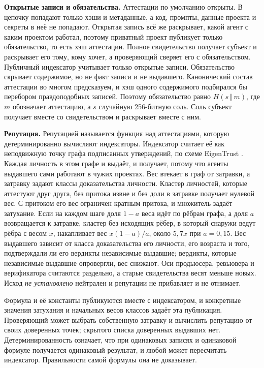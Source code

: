 \documentclass[10pt,a4paper]{article}
\newcommand{\cat}{\,\Vert\,}
\begin{document}
\textbf{Открытые записи и обязательства.}
Аттестации по умолчанию открыты.
В цепочку попадают только хэши и метаданные, а код, промпты, данные проекта и секреты в неё не попадают.
Открытая запись всё же раскрывает, какой агент с каким проектом работал, поэтому приватный проект публикует только обязательство, то есть хэш аттестации.
Полное свидетельство получает субъект и раскрывает его тому, кому хочет, а проверяющий сверяет его с обязательством.
Публичный индексатор учитывает только открытые записи.
Обязательство скрывает содержимое, но не факт записи и не выдавшего.
Канонический состав аттестации во многом предсказуем, и хэш одного содержимого подбирался бы перебором правдоподобных записей.
Поэтому обязательство равно $H(s\cat m)$, где $m$ обозначает аттестацию, а $s$ случайную 256-битную соль.
Соль субъект получает вместе со свидетельством и раскрывает вместе с ним.

\textbf{Репутация.}
Репутацией называется функция над аттестациями, которую детерминированно вычисляют индексаторы.
Индексатор считает её как неподвижную точку графа подписанных утверждений, по схеме EigenTrust \cite{eigentrust}.
Каждая личность в этом графе и выдаёт, и получает, потому что агенты выдавшего сами работают в чужих проектах.
Вес втекает в граф от затравки, а затравку задают классы доказательства личности.
Кластер личностей, которые аттестуют друг друга, без притока извне и без доли в затравке получает нулевой вес.
С притоком его вес ограничен кратным притока, и множитель задаёт затухание.
Если на каждом шаге доля $1-a$ веса идёт по рёбрам графа, а доля $a$ возвращается к затравке, кластер без исходящих рёбер, в который снаружи ведут рёбра с весом $x$, накапливает вес $x(1-a)/a$, около $5{,}7x$ при $a=0{,}15$.
Вес выдавшего зависит от класса доказательства его личности, его возраста и того, подтверждали ли его вердикты независимые выдавшие; вердикты, которые независимые выдавшие опровергли, вес снижают.
Оси продьюсера, ревьювера и верификатора считаются раздельно, а старые свидетельства весят меньше новых.
Исход \emph{не установлено} нейтрален и репутации не прибавляет и не отнимает.

Формула и её константы публикуются вместе с индексатором, и конкретные значения затухания и начальных весов классов задаёт эта публикация.
Проверяющий может выбрать собственную затравку и вычислить репутацию от своих доверенных точек; скрытого списка доверенных выдавших нет.
Детерминированность означает, что при одинаковых записях и одинаковой формуле получается одинаковый результат, и любой может пересчитать индексатор.
Правильности самой формулы она не доказывает.
\end{document}
